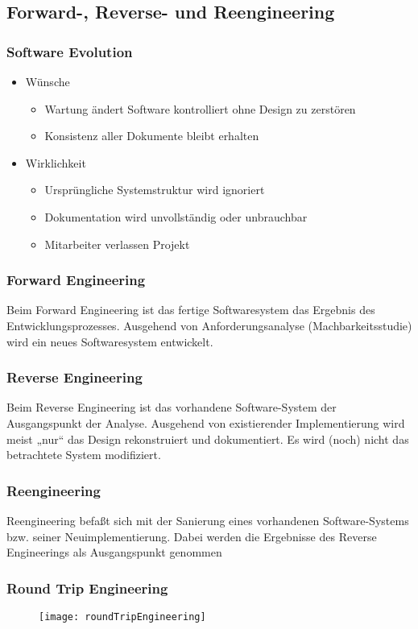	\subsection{Forward-, Reverse- und Reengineering}
	\subsubsection{Software Evolution}
	\begin{itemize}
		\item Wünsche
		\begin{itemize}
			\item Wartung ändert Software kontrolliert ohne Design zu zerstören
			\item Konsistenz aller Dokumente bleibt erhalten
		\end{itemize}
		\item Wirklichkeit
		\begin{itemize}
			\item Ursprüngliche Systemstruktur wird ignoriert
			\item Dokumentation wird unvollständig oder unbrauchbar
			\item Mitarbeiter verlassen Projekt
		\end{itemize}
	\end{itemize}
	\subsubsection{Forward Engineering}
	Beim Forward Engineering ist das fertige Softwaresystem das Ergebnis des Entwicklungsprozesses. Ausgehend von Anforderungsanalyse (Machbarkeitsstudie) wird ein neues Softwaresystem entwickelt.
	\subsubsection{Reverse Engineering}
	Beim Reverse Engineering ist das vorhandene Software-System der Ausgangspunkt der Analyse. Ausgehend von existierender Implementierung wird meist „nur“ das Design rekonstruiert und dokumentiert. Es wird (noch) nicht das betrachtete System modifiziert.
	\subsubsection{Reengineering}
	Reengineering befaßt sich mit der Sanierung eines vorhandenen Software-Systems bzw. seiner Neuimplementierung. Dabei werden die Ergebnisse des Reverse Engineerings als Ausgangspunkt genommen
	\subsubsection{Round Trip Engineering}
	\begin{figure}[h]
		\centering
		\texttt{[image: roundTripEngineering]}
	\end{figure}
